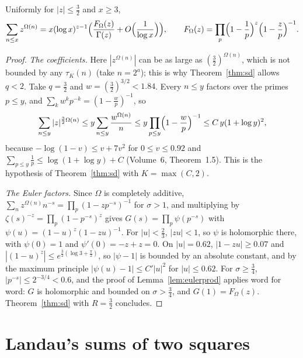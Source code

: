 \begin{corollary}\label{cor:bigomegasd}
Uniformly for $|z|\le\frac32$ and $x\ge3$,
\[
\sum_{n\le x}z^{\Omega(n)}=x(\log x)^{z-1}\Bigl(\frac{F_\Omega(z)}{\Gamma(z)}+O\Bigl(\frac1{\log x}\Bigr)\Bigr),\qquad F_\Omega(z)=\prod_p\Bigl(1-\frac1p\Bigr)^z\Bigl(1-\frac zp\Bigr)^{-1}.
\]
\end{corollary}
\begin{proof}
\emph{The coefficients.} Here $|z^{\Omega(n)}|$ can be as large as $(\frac32)^{\Omega(n)}$, which is not bounded by any $\tau_K(n)$ (take $n=2^a$); this is why Theorem~\ref{thm:sd} allows $q<2$. Take $q=\frac32$ and $w=(\frac32)^{3/2}<1.84$. Every $n\le y$ factors over the primes $p\le y$, and $\sum_kw^kp^{-k}=(1-\frac wp)^{-1}$, so
\[
\sum_{n\le y}|z|^{\frac32\Omega(n)}\le y\sum_{n\le y}\frac{w^{\Omega(n)}}n\le y\prod_{p\le y}\Bigl(1-\frac wp\Bigr)^{-1}\le C\,y(1+\log y)^2,
\]
because $-\log(1-v)\le v+7v^2$ for $0\le v\le0.92$ and $\sum_{p\le y}\frac1p\le\log(1+\log y)+C$ (Volume~6, Theorem~1.5). This is the hypothesis of Theorem~\ref{thm:sd} with $K=\max(C,2)$.

\emph{The Euler factors.} Since $\Omega$ is completely additive, $\sum_nz^{\Omega(n)}n^{-s}=\prod_p(1-zp^{-s})^{-1}$ for $\sigma>1$, and multiplying by $\zeta(s)^{-z}=\prod_p(1-p^{-s})^z$ gives $G(s)=\prod_p\psi(p^{-s})$ with $\psi(u)=(1-u)^z(1-zu)^{-1}$. For $|u|<\frac23$, $|zu|<1$, so $\psi$ is holomorphic there, with $\psi(0)=1$ and $\psi'(0)=-z+z=0$. On $|u|=0.62$, $|1-zu|\ge0.07$ and $|(1-u)^z|\le e^{\frac32(\log3+\frac\pi2)}$, so $|\psi-1|$ is bounded by an absolute constant, and by the maximum principle $|\psi(u)-1|\le C'|u|^2$ for $|u|\le0.62$. For $\sigma\ge\frac34$, $|p^{-s}|\le2^{-3/4}<0.6$, and the proof of Lemma~\ref{lem:eulerprod} applies word for word: $G$ is holomorphic and bounded on $\sigma>\frac34$, and $G(1)=F_\Omega(z)$. Theorem~\ref{thm:sd} with $R=\frac32$ concludes.
\end{proof}

\section{Landau's sums of two squares}

